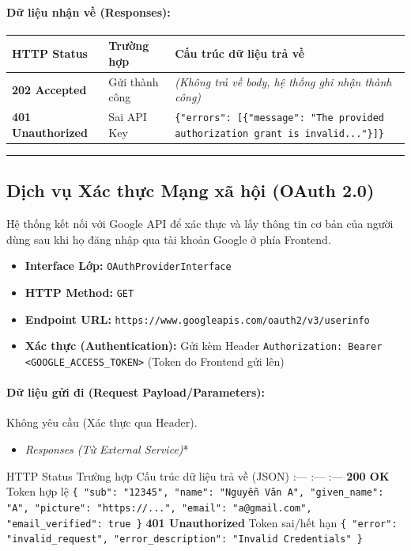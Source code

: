 \documentclass[12pt,a4paper]{article}
\begin{document}
\paragraph{Dữ liệu nhận về (Responses):}
\begin{longtable}{|p{2.8cm}|p{3.2cm}|p{8.0cm}|}
\hline
\textbf{HTTP Status} & \textbf{Trường hợp} & \textbf{Cấu trúc dữ liệu trả về} \\ \hline
\endhead
\textbf{202 Accepted} & Gửi thành công & \textit{(Không trả về body, hệ thống ghi nhận thành công)} \\ \hline
\textbf{401 Unauthorized} & Sai API Key & \texttt{\{"errors": [\{"message": "The provided authorization grant is invalid..."\}]\}} \\ \hline
\end{longtable}

\vskip 0.4cm
\noindent\rule{\textwidth}{0.3pt}
\vskip 0.4cm

\subsection{Dịch vụ Xác thực Mạng xã hội (OAuth 2.0)}
Hệ thống kết nối với Google API để xác thực và lấy thông tin cơ bản của người dùng sau khi họ đăng nhập qua tài khoản Google ở phía Frontend.

\begin{itemize}[leftmargin=*]
    \item \textbf{Interface Lớp:} \texttt{OAuthProviderInterface}
    \item \textbf{HTTP Method:} \texttt{GET}
    \item \textbf{Endpoint URL:} \texttt{https://www.googleapis.com/oauth2/v3/userinfo}
    \item \textbf{Xác thực (Authentication):} Gửi kèm Header \texttt{Authorization: Bearer \textless{}GOOGLE\_ACCESS\_TOKEN\textgreater{}} (Token do Frontend gửi lên)
\end{itemize}

\paragraph{Dữ liệu gửi đi (Request Payload/Parameters):}
Không yêu cầu (Xác thực qua Header).
\begin{itemize}[leftmargin=*]
    \item \textit{Responses (Từ External Service)}*
\end{itemize}

\textbar{} HTTP Status \textbar{} Trường hợp \textbar{} Cấu trúc dữ liệu trả về (JSON) \textbar{}
\textbar{} :--- \textbar{} :--- \textbar{} :--- \textbar{}
\textbar{} \textbf{200 OK} \textbar{} Token hợp lệ \textbar{} \texttt{\{ "sub": "12345", "name": "Nguyễn Văn A", "given\_name": "A", "picture": "https://...", "email": "a@gmail.com", "email\_verified": true \}} \textbar{}
\textbar{} \textbf{401 Unauthorized}\textbar{} Token sai/hết hạn \textbar{} \texttt{\{ "error": "invalid\_request", "error\_description": "Invalid Credentials" \}} \textbar{}
\end{document}
